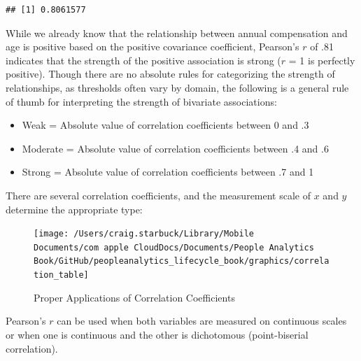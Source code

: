 \documentclass[]{book}
\newenvironment{Shaded}{\begin{snugshade}}{\end{snugshade}}
\newcommand{\CommentTok}[1]{\textcolor[rgb]{0.56,0.35,0.01}{\textit{#1}}}
\newcommand{\DataTypeTok}[1]{\textcolor[rgb]{0.13,0.29,0.53}{#1}}
\newcommand{\KeywordTok}[1]{\textcolor[rgb]{0.13,0.29,0.53}{\textbf{#1}}}
\newcommand{\NormalTok}[1]{#1}
\newcommand{\OperatorTok}[1]{\textcolor[rgb]{0.81,0.36,0.00}{\textbf{#1}}}
\newcommand{\StringTok}[1]{\textcolor[rgb]{0.31,0.60,0.02}{#1}}
\providecommand{\tightlist}{%
  \setlength{\itemsep}{0pt}\setlength{\parskip}{0pt}}
\begin{document}
\begin{Shaded}
\end{Shaded}

\begin{verbatim}
## [1] 0.8061577
\end{verbatim}

While we already know that the relationship between annual compensation and age is positive based on the positive covariance coefficient, Pearson's \(r\) of .81 indicates that the strength of the positive association is strong (\(r\) = 1 is perfectly positive). Though there are no absolute rules for categorizing the strength of relationships, as thresholds often vary by domain, the following is a general rule of thumb for interpreting the strength of bivariate associations:

\begin{itemize}
\tightlist
\item
  Weak = Absolute value of correlation coefficients between 0 and .3
\item
  Moderate = Absolute value of correlation coefficients between .4 and .6
\item
  Strong = Absolute value of correlation coefficients between .7 and 1
\end{itemize}

There are several correlation coefficients, and the measurement scale of \(x\) and \(y\) determine the appropriate type:

\begin{figure}

{\centering \texttt{[image: /Users/craig.starbuck/Library/Mobile Documents/com~apple~CloudDocs/Documents/People Analytics Book/GitHub/peopleanalytics\_lifecycle\_book/graphics/correlation\_table]} 

}

\caption{Proper Applications of Correlation Coefficients}\label{fig:corr-table}
\end{figure}

Pearson's \(r\) can be used when both variables are measured on continuous scales or when one is continuous and the other is dichotomous (point-biserial correlation).
\end{document}
